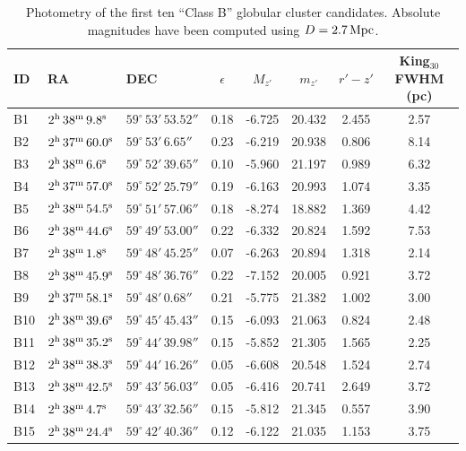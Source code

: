 \documentclass[useAMS,usenatbib]{mn2e}
\begin{document}
\begin{table}
 \centering
  \caption{Photometry of the first ten ``Class B'' globular cluster candidates. Absolute magnitudes have been computed using $D = 2.7\,\rm{Mpc}$.}
\label{tab:class_b}  
\begin{tabular}{lllccccc}
	\hline
	ID & RA & DEC & $\epsilon$ & $M_{z'}$ & $m_{z'}$ & $r'-z'$ & King$_{30}$ FWHM (pc) \\
	\hline
	B1 & $2^{\rm{h}}\,38^{\rm{m}}\,9.8^{\rm{s}}$ & $59^\circ\,53'\,53.52''$ & 0.18 & -6.725 & 20.432 & 2.455 & 2.57 \\
	B2 & $2^{\rm{h}}\,37^{\rm{m}}\,60.0^{\rm{s}}$ & $59^\circ\,53'\,6.65''$ & 0.23 & -6.219 & 20.938 & 0.806 & 8.14 \\
	B3 & $2^{\rm{h}}\,38^{\rm{m}}\,6.6^{\rm{s}}$ & $59^\circ\,52'\,39.65''$ & 0.10 & -5.960 & 21.197 & 0.989 & 6.32 \\
	B4 & $2^{\rm{h}}\,37^{\rm{m}}\,57.0^{\rm{s}}$ & $59^\circ\,52'\,25.79''$ & 0.19 & -6.163 & 20.993 & 1.074 & 3.35 \\
	B5 & $2^{\rm{h}}\,38^{\rm{m}}\,54.5^{\rm{s}}$ & $59^\circ\,51'\,57.06''$ & 0.18 & -8.274 & 18.882 & 1.369 & 4.42 \\
	B6 & $2^{\rm{h}}\,38^{\rm{m}}\,44.6^{\rm{s}}$ & $59^\circ\,49'\,53.00''$ & 0.22 & -6.332 & 20.824 & 1.592 & 7.53 \\
	B7 & $2^{\rm{h}}\,38^{\rm{m}}\,1.8^{\rm{s}}$ & $59^\circ\,48'\,45.25''$ & 0.07 & -6.263 & 20.894 & 1.318 & 2.14 \\
	B8 & $2^{\rm{h}}\,38^{\rm{m}}\,45.9^{\rm{s}}$ & $59^\circ\,48'\,36.76''$ & 0.22 & -7.152 & 20.005 & 0.921 & 3.72 \\
	B9 & $2^{\rm{h}}\,37^{\rm{m}}\,58.1^{\rm{s}}$ & $59^\circ\,48'\,0.68''$ & 0.21 & -5.775 & 21.382 & 1.002 & 3.00 \\
	B10 & $2^{\rm{h}}\,38^{\rm{m}}\,39.6^{\rm{s}}$ & $59^\circ\,45'\,45.43''$ & 0.15 & -6.093 & 21.063 & 0.824 & 2.48 \\
	B11 & $2^{\rm{h}}\,38^{\rm{m}}\,35.2^{\rm{s}}$ & $59^\circ\,44'\,39.98''$ & 0.15 & -5.852 & 21.305 & 1.565 & 2.25 \\
	B12 & $2^{\rm{h}}\,38^{\rm{m}}\,38.3^{\rm{s}}$ & $59^\circ\,44'\,16.26''$ & 0.05 & -6.608 & 20.548 & 1.524 & 2.74 \\
	B13 & $2^{\rm{h}}\,38^{\rm{m}}\,42.5^{\rm{s}}$ & $59^\circ\,43'\,56.03''$ & 0.05 & -6.416 & 20.741 & 2.649 & 3.72 \\
	B14 & $2^{\rm{h}}\,38^{\rm{m}}\,4.7^{\rm{s}}$ & $59^\circ\,43'\,32.56''$ & 0.15 & -5.812 & 21.345 & 0.557 & 3.90 \\
	B15 & $2^{\rm{h}}\,38^{\rm{m}}\,24.4^{\rm{s}}$ & $59^\circ\,42'\,40.36''$ & 0.12 & -6.122 & 21.035 & 1.153 & 3.75 \\
	\hline
\end{tabular}
\end{table}



\label{lastpage}
\end{document}
